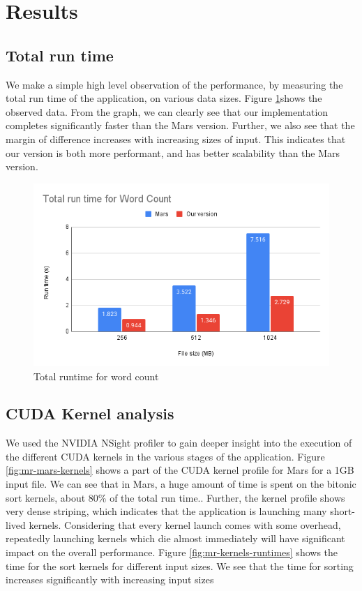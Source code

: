 \documentclass{article}
\begin{document}
\section{Results}
\subsection{Total run time}
We make a simple high level observation of the performance, by measuring the total run time of the application, on various data sizes. Figure \ref{fig:mr-runtime}shows the observed data. From the graph, we can clearly see that our implementation completes significantly faster than the Mars version. Further, we also see that the margin of difference increases with increasing sizes of input. This indicates that our version is both more performant, and has better scalability than 
the Mars version.

\begin{figure}
    \centering
    \includegraphics[width=1\linewidth]{images/mr-runtime.png}
    \caption{Total runtime for word count}
    \label{fig:mr-runtime}
\end{figure}

\subsection{CUDA Kernel analysis}
We used the NVIDIA NSight profiler to gain deeper insight into the execution of the different CUDA kernels in the various stages of the application. Figure \ref{fig:mr-mars-kernels} shows a part of the CUDA kernel profile for Mars for a 1GB input file. We can see that in Mars, a huge amount of time is spent on the bitonic sort kernels, about 80\% of the total run time.. Further, the kernel profile shows very dense striping, which indicates that the application is launching many short-lived kernels. Considering that every kernel launch comes with some overhead, repeatedly launching kernels which die almost immediately will have significant impact on the overall performance.  Figure \ref{fig:mr-kernels-runtimes} shows the time for the sort kernels for different input sizes. We see that the time for sorting increases significantly with increasing input sizes
\end{document}
